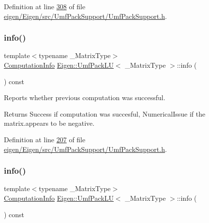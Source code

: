 Definition at line \hyperlink{eigen_2_eigen_2src_2_umf_pack_support_2_umf_pack_support_8h_source_l00308}{308} of file \hyperlink{eigen_2_eigen_2src_2_umf_pack_support_2_umf_pack_support_8h_source}{eigen/\+Eigen/src/\+Umf\+Pack\+Support/\+Umf\+Pack\+Support.\+h}.

\mbox{\label{class_eigen_1_1_umf_pack_l_u_a68738a0d99c67316877706f98b033402}} 
\subsubsection{\texorpdfstring{info()}{info()}\hspace{0.1cm}{\footnotesize\ttfamily [1/2]}}
{\footnotesize\ttfamily template$<$typename \+\_\+\+Matrix\+Type$>$ \\
\hyperlink{group__enums_ga85fad7b87587764e5cf6b513a9e0ee5e}{Computation\+Info} \hyperlink{class_eigen_1_1_umf_pack_l_u}{Eigen\+::\+Umf\+Pack\+LU}$<$ \+\_\+\+Matrix\+Type $>$\+::info (\begin{DoxyParamCaption}{ }\end{DoxyParamCaption}) const\hspace{0.3cm}{\ttfamily [inline]}}



Reports whether previous computation was successful. 

\begin{DoxyReturn}{Returns}
{\ttfamily Success} if computation was succesful, {\ttfamily Numerical\+Issue} if the matrix.\+appears to be negative. 
\end{DoxyReturn}


Definition at line \hyperlink{eigen_2_eigen_2src_2_umf_pack_support_2_umf_pack_support_8h_source_l00207}{207} of file \hyperlink{eigen_2_eigen_2src_2_umf_pack_support_2_umf_pack_support_8h_source}{eigen/\+Eigen/src/\+Umf\+Pack\+Support/\+Umf\+Pack\+Support.\+h}.

\mbox{\label{class_eigen_1_1_umf_pack_l_u_a68738a0d99c67316877706f98b033402}} 
\subsubsection{\texorpdfstring{info()}{info()}\hspace{0.1cm}{\footnotesize\ttfamily [2/2]}}
{\footnotesize\ttfamily template$<$typename \+\_\+\+Matrix\+Type$>$ \\
\hyperlink{group__enums_ga85fad7b87587764e5cf6b513a9e0ee5e}{Computation\+Info} \hyperlink{class_eigen_1_1_umf_pack_l_u}{Eigen\+::\+Umf\+Pack\+LU}$<$ \+\_\+\+Matrix\+Type $>$\+::info (\begin{DoxyParamCaption}{ }\end{DoxyParamCaption}) const\hspace{0.3cm}{\ttfamily [inline]}}



